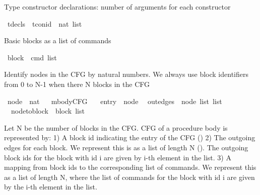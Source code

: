 \begin{isabellebody}
\begin{isamarkuptext}%
Type constructor declarations: number of arguments for each constructor%
\end{isamarkuptext}\isamarkuptrue%
\isamarkupfalse%
\ tdecls\ {\isacharequal}{\kern0pt}\ {\isachardoublequoteopen}{\isacharparenleft}{\kern0pt}tcon{\isacharunderscore}{\kern0pt}id\ {\isasymtimes}\ nat{\isacharparenright}{\kern0pt}\ list{\isachardoublequoteclose}%
\begin{isamarkuptext}%
Basic blocks as a list of commands%
\end{isamarkuptext}\isamarkuptrue%
\isamarkupfalse%
\ block\ {\isacharequal}{\kern0pt}\ {\isachardoublequoteopen}cmd\ list{\isachardoublequoteclose}%
\begin{isamarkuptext}%
Identify nodes in the CFG by natural numbers. We always use block identifiers from 0 to N-1 when
there N blocks in the CFG%
\end{isamarkuptext}\isamarkuptrue%
\isamarkupfalse%
\ node\ {\isacharequal}{\kern0pt}\ {\isachardoublequoteopen}nat{\isachardoublequoteclose}\isanewline
\ \isanewline
{}\isamarkupfalse%
\ mbodyCFG\ {\isacharequal}{\kern0pt}\isanewline
\ \ entry\ {\isacharcolon}{\kern0pt}{\isacharcolon}{\kern0pt}\ {\isachardoublequoteopen}node{\isachardoublequoteclose}\isanewline
\ \ out{\isacharunderscore}{\kern0pt}edges\ {\isacharcolon}{\kern0pt}{\isacharcolon}{\kern0pt}\ {\isachardoublequoteopen}{\isacharparenleft}{\kern0pt}node\ list{\isacharparenright}{\kern0pt}\ list{\isachardoublequoteclose}\isanewline
\ \ node{\isacharunderscore}{\kern0pt}to{\isacharunderscore}{\kern0pt}block\ {\isacharcolon}{\kern0pt}{\isacharcolon}{\kern0pt}\ {\isachardoublequoteopen}block\ list{\isachardoublequoteclose}%
\begin{isamarkuptext}%
Let N be the number of blocks in the CFG.
CFG of a procedure body is represented by:
  1) A block id indicating the entry of the CFG ()
  2) The outgoing edges for each block. We represent this is as a list of length N ().
     The outgoing block ids for the block with id i are given by i-th element in the list.
  3) A mapping from block ids to the corresponding list of commands. We represent this as a list of
     length N, where the list of commands for the block with id i are given by the i-th element in
     the list.%

\end{isamarkuptext}
\end{isabellebody}
